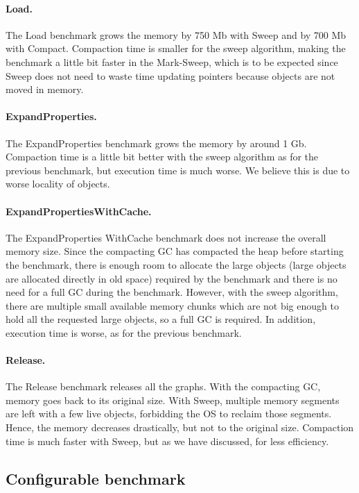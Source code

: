 \documentclass[10pt, sigplan]{acmart}
\begin{document}
\paragraph{Load.} The Load benchmark grows the memory by 750 Mb with Sweep and by 700 Mb with Compact. Compaction time is smaller for the sweep algorithm, making the benchmark a little bit faster in the Mark-Sweep, which is to be expected since Sweep does not need to waste time updating pointers because objects are not moved in memory.

\paragraph{ExpandProperties.} The ExpandProperties benchmark grows the memory by around 1 Gb. Compaction time is a little bit better with the sweep algorithm as for the previous benchmark, but execution time is much worse. We believe this is due to worse locality of objects. 

\paragraph{ExpandPropertiesWithCache.} The ExpandProperties WithCache benchmark does not increase the overall memory size. Since the compacting GC has compacted the heap before starting the benchmark, there is enough room to allocate the large objects (large objects are allocated directly in old space) required by the benchmark and there is no need for a full GC during the benchmark. However, with the sweep algorithm, there are multiple small available memory chunks which are not big enough to hold all the requested large objects, so a full GC is required. In addition, execution time is worse, as for the previous benchmark.

\paragraph{Release.} The Release benchmark releases all the graphs. With the compacting GC, memory goes back to its original size. With Sweep, multiple memory segments are left with a few live objects, forbidding the OS to reclaim those segments. Hence, the memory decreases drastically, but not to the original size. Compaction time is much faster with Sweep, but as we have discussed, for less efficiency.

\subsection{Configurable benchmark}
\end{document}
